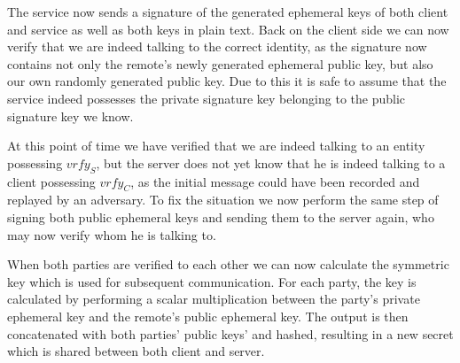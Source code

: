 The service now sends a signature of the generated ephemeral keys of both client and service as well as both keys in plain text.
Back on the client side we can now verify that we are indeed talking to the correct identity, as the signature now contains not only the remote's newly generated ephemeral public key, but also our own randomly generated public key.
Due to this it is safe to assume that the service indeed possesses the private signature key belonging to the public signature key we know.

At this point of time we have verified that we are indeed talking to an entity possessing $vrfy_S$, but the server does not yet know that he is indeed talking to a client possessing $vrfy_C$, as the initial message could have been recorded and replayed by an adversary.
To fix the situation we now perform the same step of signing both public ephemeral keys and sending them to the server again, who may now verify whom he is talking to.

When both parties are verified to each other we can now calculate the symmetric key which is used for subsequent communication.
For each party, the key is calculated by performing a scalar multiplication between the party's private ephemeral key and the remote's public ephemeral key.
The output is then concatenated with both parties' public keys' and hashed, resulting in a new secret which is shared between both client and server.

